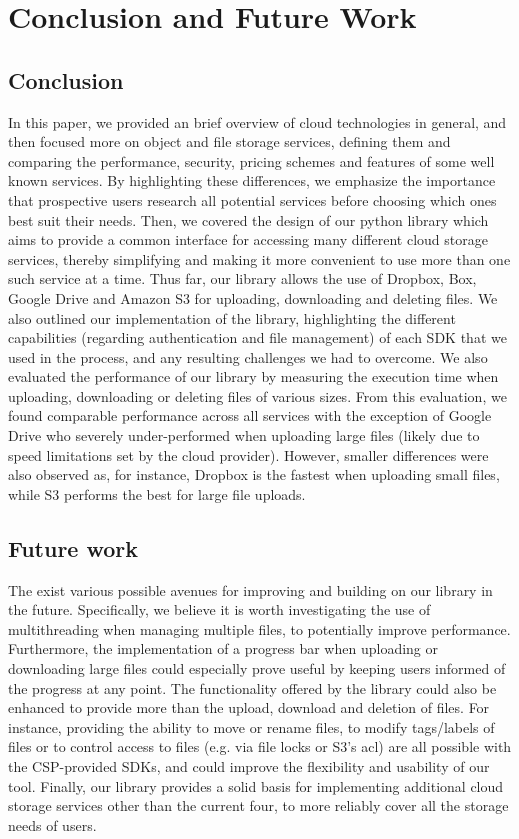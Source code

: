\chapter{Conclusion and Future Work}\label{ch:conclusion}

\section{Conclusion}
In this paper, we provided an brief overview of cloud technologies in general, and then focused more on object and file storage services, defining them and comparing the performance, security, pricing schemes and features of some well known services. By highlighting these differences, we emphasize the importance that prospective users research all potential services before choosing which ones best suit their needs. Then, we covered the design of our python library which aims to provide a common interface for accessing many different cloud storage services, thereby simplifying and making it more convenient to use more than one such service at a time. Thus far, our library allows the use of Dropbox, Box, Google Drive and Amazon S3 for uploading, downloading and deleting files. We also outlined our implementation of the library, highlighting the different capabilities (regarding authentication and file management) of each SDK that we used in the process, and any resulting challenges we had to overcome. We also evaluated the performance of our library by measuring the execution time when uploading, downloading or deleting files of various sizes. From this evaluation, we found comparable performance across all services with the exception of Google Drive who severely under-performed when uploading large files (likely due to speed limitations set by the cloud provider). However, smaller differences were also observed as, for instance, Dropbox is the fastest when uploading small files, while S3 performs the best for large file uploads.

\section{Future work}
The exist various possible avenues for improving and building on our library in the future. Specifically, we believe it is worth investigating the use of multithreading when managing multiple files, to potentially improve performance.  Furthermore, the implementation of a progress bar when uploading or downloading large files could especially prove useful by keeping users informed of the progress at any point. The functionality offered by the library  could also be enhanced to provide more than the upload, download and deletion of files. For instance, providing the ability to move or rename files, to modify tags/labels of files or to control access to files (e.g. via file locks or S3's \ac{acl}) are all possible with the CSP-provided SDKs, and could improve the flexibility and usability of our tool. Finally, our library provides a solid basis for implementing additional cloud storage services other than the current four, to more reliably cover all the storage needs of users. 